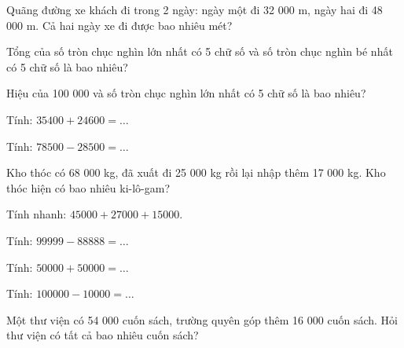 \begin{ex}
Quãng đường xe khách đi trong 2 ngày: ngày một đi 32 000 m, ngày hai đi 48 000 m. Cả hai ngày xe đi được bao nhiêu mét?
\end{ex}

\begin{ex}
Tổng của số tròn chục nghìn lớn nhất có 5 chữ số và số tròn chục nghìn bé nhất có 5 chữ số là bao nhiêu?
\end{ex}

\begin{ex}
Hiệu của 100 000 và số tròn chục nghìn lớn nhất có 5 chữ số là bao nhiêu?
\end{ex}

\begin{ex}
Tính: $35400 + 24600 = \dots$
\end{ex}

\begin{ex}
Tính: $78500 - 28500 = \dots$
\end{ex}

\begin{ex}
Kho thóc có 68 000 kg, đã xuất đi 25 000 kg rồi lại nhập thêm 17 000 kg. Kho thóc hiện có bao nhiêu ki-lô-gam?
\end{ex}

\begin{ex}
Tính nhanh: $45000 + 27000 + 15000$.
\end{ex}

\begin{ex}
Tính: $99999 - 88888 = \dots$
\end{ex}

\begin{ex}
Tính: $50000 + 50000 = \dots$
\end{ex}

\begin{ex}
Tính: $100000 - 10000 = \dots$
\end{ex}

\begin{ex}
Một thư viện có 54 000 cuốn sách, trường quyên góp thêm 16 000 cuốn sách. Hỏi thư viện có tất cả bao nhiêu cuốn sách?
\end{ex}

